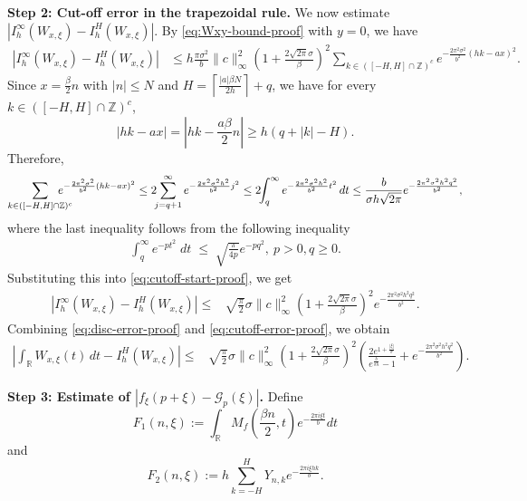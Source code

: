 \documentclass[11pt, reqno]{amsart}
\newcommand{\Z}{\mathbb{Z}}
\newcommand{\R}{\mathbb{R}}
\numberwithin{equation}{section}
\begin{document}
\begin{appendices}
\smallskip
\noindent
\textbf{Step 2: Cut-off error in the trapezoidal rule.}
We now estimate $ |I_h^\infty(W_{x,\xi})-I_h^H(W_{x,\xi})|$. 
By \eqref{eq:Wxy-bound-proof} with $y=0$, we have 
\begin{align}\label{eq:cutoff-start-proof}
|I_h^\infty(W_{x,\xi})-I_h^H(W_{x,\xi})| &\le
h\frac{\pi\sigma^2}{b} \|c\|_\infty^2 \left(1+\frac{2\sqrt{2\pi}\sigma}{\beta}\right)^2
\sum_{k\in([-H,H]\cap\Z)^c}e^{-\frac{2\pi^2\sigma^2}{b^2}(hk-ax)^2}.
\end{align}
Since $x=\frac{\beta}{2}n$ with $|n|\le N$ and $H=\left\lceil \frac{|a|\beta N}{2h}\right\rceil+q$, 
we have for every $k\in([-H,H]\cap\Z)^c$, 
$$ |hk-ax|= \left|hk-\frac{a\beta}{2}n\right|\ge h(q+|k|-H).$$
Therefore,
\begin{align*}
\sum_{k\in([-H,H]\cap\Z)^c} \hskip-.2in e^{-\frac{2\pi^2\sigma^2}{b^2}(hk-ax)^2}
\le 2 \hskip-.05in\sum_{j=q+1}^\infty e^{-\frac{2\pi^2\sigma^2 h^2}{b^2}j^2}  \le
2 \hskip-.05in\int_q^\infty e^{-\frac{2\pi^2\sigma^2 h^2}{b^2}t^2}\,dt \le
\frac{b}{\sigma h\sqrt{2\pi}} e^{-\frac{2\pi^2\sigma^2 h^2 q^2}{b^2}},
\end{align*}
where  the last inequality follows from the following inequality
    \begin{align*}
        \int_q^{\infty} e^{-p t^{2}}\;dt
	\;\le\; \sqrt{\frac{\pi}{4p}}e^{-p q^{2}}, \ p>0,q\ge0.
    \end{align*}
Substituting this into \eqref{eq:cutoff-start-proof}, we get
\begin{align}\label{eq:cutoff-error-proof}
|I_h^\infty(W_{x,\xi})-I_h^H(W_{x,\xi})|
\le {}& \sqrt{\frac{\pi}{2}} \sigma  \|c\|_\infty^2 \left(1+\frac{2\sqrt{2\pi}\sigma}{\beta}\right)^2
e^{-\frac{2\pi^2\sigma^2 h^2 q^2}{b^2}}.
\end{align}
Combining \eqref{eq:disc-error-proof} and \eqref{eq:cutoff-error-proof}, we obtain
\begin{align}\label{eq:quad-error-proof}
\left| \int_{\R}W_{x,\xi}(t)\,dt-I_h^H(W_{x,\xi}) \right|
\le {}& \sqrt{\frac{\pi}{2}} \sigma \|c\|_\infty^2 \left(1+\frac{2\sqrt{2\pi}\sigma}{\beta}\right)^2
\left(\frac{2e^{1+\frac{|\xi|}{\sigma}}}{e^{\frac{b}{\sigma h}}-1}
+e^{-\frac{2\pi^2\sigma^2 h^2 q^2}{b^2}}\right).
\end{align}

\smallskip
\noindent
\textbf{Step 3: Estimate of \( |f_\xi(p+\xi)-\mathcal G_p(\xi)| \).}
Define 
$$ F_1(n,\xi) := \int_{\R} M_f \left(\frac{\beta n}{2},t\right)e^{-\frac{2\pi i\xi t}{b}}dt$$ 
and 
$$ F_2(n,\xi) :=h\sum_{k=-H}^{H}Y_{n,k}e^{-\frac{2\pi i\xi hk}{b}}.$$ 


\end{appendices}
\end{document}
